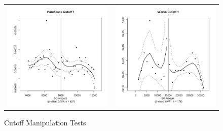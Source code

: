 \documentclass[11pt]{article}
\begin{document}
\begin{figure}[!htbp]
  \caption{\label{fig:manipulationtests} Cutoff Manipulation Tests}

  \centering

  \begin{tabular}{cc}
  \includegraphics[scale=.41]{purchasesmanipulation1} & \includegraphics[scale=.41]{worksmanipulation1} \\

\end{tabular}
\end{figure}
\end{document}

